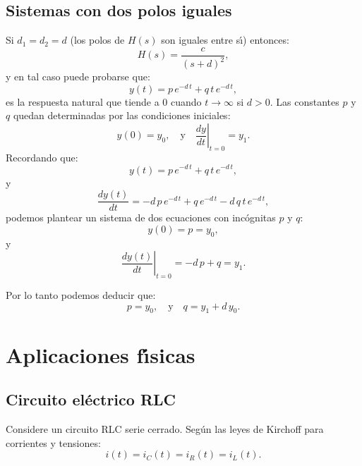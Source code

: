 \subsection{Sistemas con dos polos iguales}

Si $d_{1}=d_{2}=d$ (los polos de $H(s)$ son iguales entre s\'{\i}) entonces: 
\begin{equation}
	H\left( s\right) = \frac{c}{\left( s+d\right) ^{2}},
\end{equation}
y en tal caso puede probarse que:
\begin{equation}
	y\left( t\right) = p \, e^{-d \, t} + q \, t \, e^{-d \, t},
\end{equation}
es la respuesta natural que tiende a $0$ cuando $t \rightarrow \infty$ si $d > 0$. Las constantes $p$ y $q$ quedan determinadas por las condiciones iniciales:
\begin{equation}
	y(0) = y_{0}, \quad \text{y} \quad \left. \frac{dy}{dt} \right|_{t=0} = y_{1}.
\end{equation} 
Recordando que:
\begin{equation}
	y(t) = p \, e^{-d \, t} + q \, t \, e^{-d \, t},
\end{equation}
y
\begin{equation}
	\frac{dy(t)}{dt} = - d \, p \, e^{-d \, t} + q \, e^{-d \, t} - d \, q \, t \, e^{-d \, t},
\end{equation}
podemos plantear un sistema de dos ecuaciones con incógnitas $p$ y $q$:
\begin{equation}
	y(0) = p = y_{0},
\end{equation}
y
\begin{equation}
	\left. \frac{dy(t)}{dt} \right|_{t=0} = -d \, p + q = y_{1}.
\end{equation}

Por lo tanto podemos deducir que:
\begin{equation}
	p = y_{0}, \quad \text{y} \quad q = y_{1} + d \, y_{0}.
\end{equation}

\section{Aplicaciones f\'{\i}sicas}

\subsection{Circuito el\'{e}ctrico RLC}

Considere un circuito RLC serie cerrado. Seg\'{u}n las leyes de Kirchoff para corrientes y tensiones:
\begin{equation}
	i(t) = i_{C}(t) = i_{R}(t) = i_{L}(t).
\end{equation}

